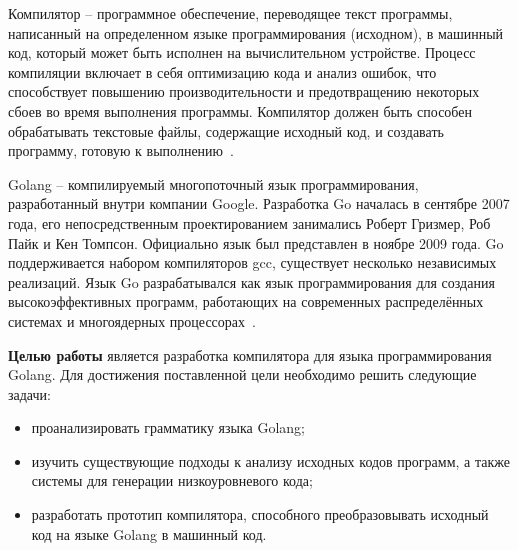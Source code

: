 \Introduction

Компилятор -- программное обеспечение, переводящее текст программы, написанный на определенном языке программирования (исходном), в машинный код, который может быть исполнен на вычислительном устройстве.
Процесс компиляции включает в себя оптимизацию кода и анализ ошибок, что способствует повышению производительности и предотвращению некоторых сбоев во время выполнения программы.
Компилятор должен быть способен обрабатывать текстовые файлы, содержащие исходный код, и создавать программу, готовую к выполнению~\cite{aho_compillers}.


Golang -- компилируемый многопоточный язык программирования, разработанный внутри компании Google.
Разработка Go началась в сентябре 2007 года, его непосредственным проектированием занимались Роберт Гризмер, Роб Пайк и Кен Томпсон.
Официально язык был представлен в ноябре 2009 года.
Go поддерживается набором компиляторов gcc, существует несколько независимых реализаций.
Язык Go разрабатывался как язык программирования для создания высокоэффективных программ, работающих на современных распределённых системах и многоядерных процессорах~\cite{bodner2024learninggo}.


\textbf{Целью работы} является разработка компилятора для языка программирования Golang.
Для достижения поставленной цели необходимо решить следующие задачи:
\begin{itemize}
    \item проанализировать грамматику языка Golang;
    \item изучить существующие подходы к анализу исходных кодов программ, а также системы для генерации низкоуровневого кода;
    \item разработать прототип компилятора, способного преобразовывать исходный код на языке Golang в машинный код.

\end{itemize}





